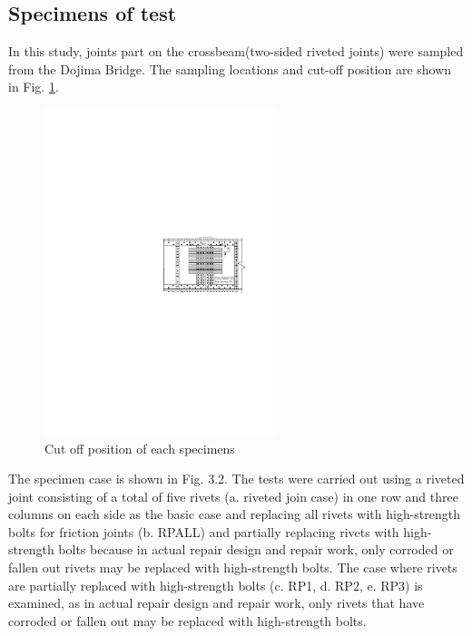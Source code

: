 \subsection{Specimens of test}

In this study, joints part on the crossbeam(two-sided riveted joints) were sampled from the Dojima Bridge. The sampling locations and cut-off position are shown in Fig. \ref{fig-cutoff}.

\begin{figure}[htbp]
    \centering
    \includegraphics[width=0.6\textwidth]{imgs/ch4/figA1.pdf}
    \caption{Cut off position of each specimens}
    \label{fig-cutoff}
\end{figure}

The specimen case is shown in Fig. 3.2. The tests were carried out using a riveted joint consisting of a total of five rivets (a. riveted join case) in one row and three columns on each side as the basic case and replacing all rivets with high-strength bolts for friction joints (b. RPALL) and partially replacing rivets with high-strength bolts because in actual repair design and repair work, only corroded or fallen out rivets may be replaced with high-strength bolts. The case where rivets are partially replaced with high-strength bolts (c. RP1, d. RP2, e. RP3) is examined, as in actual repair design and repair work, only rivets that have corroded or fallen out may be replaced with high-strength bolts.

